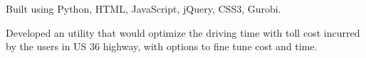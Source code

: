 \documentclass[]{deedy-resume-openfont}
\begin{document}
\begin{minipage}[t]{0.66\textwidth}
\begin{tightemize}
\item Built using  Python, HTML, JavaScript, jQuery, CSS3, Gurobi.
\item Developed an utility that would optimize the driving time with toll cost incurred by the users in US 36 highway, with options to fine tune cost and time.
\end{tightemize}
\sectionsep


\end{minipage}
\end{document}
